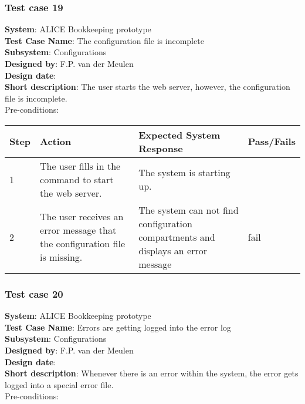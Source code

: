 \subsubsection{Test case 19}
\textbf{System}:  ALICE Bookkeeping prototype \\
\textbf{Test Case Name}:  The configuration file is incomplete \\
\textbf{Subsystem}:  Configurations \\
\textbf{Designed by}:  F.P. van der Meulen\\
\textbf{Design date}:  \\
\textbf{Short description}: The user starts the web server, however, the configuration file is incomplete. \\

Pre-conditions: \\

\begin{longtable}{ | p{0.8cm} | p{4.5cm} | p{6cm} | p{1.5cm} |}
\hline
Step & Action & Expected System Response & Pass/Fails  \\ \hline
1 & The user fills in the command to start the web server. & The system is starting up. &  \\ \hline
2 & The user receives an error message that the configuration file is missing. & The system can not find configuration compartments and displays an error message & fail\\ \hline
 
\end{longtable}

\subsubsection{Test case 20}
\textbf{System}:  ALICE Bookkeeping prototype \\
\textbf{Test Case Name}:  Errors are getting logged into the error log  \\
\textbf{Subsystem}:  Configurations \\
\textbf{Designed by}:  F.P. van der Meulen\\
\textbf{Design date}:  \\
\textbf{Short description}: Whenever there is an error within the system, the error gets logged into a special error file. \\

Pre-conditions: \\

